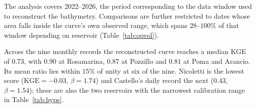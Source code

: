 The analysis covers 2022--2026, the period corresponding to the data window used to
reconstruct the bathymetry. Comparisons are further restricted to dates whose area falls
inside the curve's own observed range, which spans $28$--$100\%$ of that window depending
on reservoir (Table~\ref{tab:opvol}).

\begin{table}[htbp]\centering\small
\caption{Reconstructed storage against the officially registered volume, 2022--2026,
restricted to dates inside the curve's own observed area range (coverage). Skill is scored
with KGE and RMSE (Section~\ref{sec:inputvalid}); $\beta$ is the mean ratio.}
\label{tab:opvol}
\end{table}

Across the nine monthly records the reconstructed curve reaches a median KGE of $0.73$,
with $0.90$ at Rosamarina, $0.87$ at Pozzillo and $0.81$ at Poma and Arancio. Its mean
ratio lies within $15\%$ of unity at six of the nine. Nicoletti is the lowest score
($\mathrm{KGE}=-0.03$, $\beta=1.74$) and Castello's daily record the next
($0.43$, $\beta=1.54$); these are also the two reservoirs with the narrowest calibration
range in Table~\ref{tab:hyps}.

